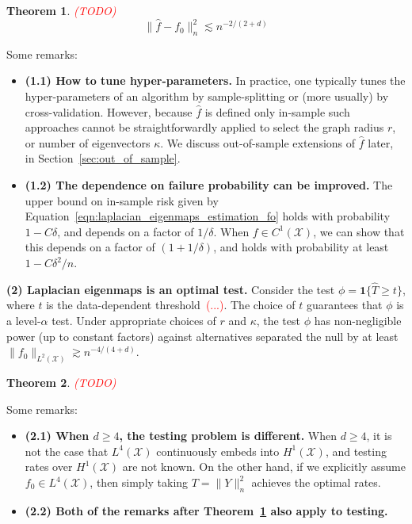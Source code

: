 \documentclass{article}
\newcommand{\1}{\mathbf{1}}
\newcommand{\Leb}{L}
\newcommand{\mc}[1]{\mathcal{#1}}
\newcommand{\wh}[1]{\widehat{#1}}
\theoremstyle{alden}
\theoremstyle{aldenthm}
\newtheorem{theorem}{Theorem}
\theoremstyle{definition}
\theoremstyle{remark}
\begin{document}
\begin{theorem}
	\label{thm:laplacian_eigenmaps_estimation_fo}
	\textcolor{red}{(TODO)}
	\begin{equation}
	\label{eqn:laplacian_eigenmaps_estimation_fo}
	\|\wh{f} - f_0\|_n^2 \lesssim n^{-2/(2 + d)}
	\end{equation}
\end{theorem}
Some remarks:
\begin{itemize}
	\item \textbf{(1.1) How to tune hyper-parameters.} In practice, one typically tunes the hyper-parameters of an algorithm by sample-splitting or (more usually) by cross-validation. However, because $\wh{f}$ is defined only in-sample such approaches cannot be straightforwardly applied to select the graph radius $r$, or number of eigenvectors $\kappa$. We discuss out-of-sample extensions of $\wh{f}$ later, in Section~\ref{sec:out_of_sample}.
	\item \textbf{(1.2) The dependence on failure probability can be improved.} The upper bound on in-sample risk given by Equation~\eqref{eqn:laplacian_eigenmaps_estimation_fo} holds with probability $1 - C\delta$, and depends on a factor of $1/\delta$. When $f \in C^1(\mc{X})$, we can show that this depends on a factor of $(1 + 1/\delta)$, and holds with probability at least $1 - C\delta^2/n$. 
\end{itemize}

\textbf{(2) Laplacian eigenmaps is an optimal test.} Consider the test $\phi = \1\{\wh{T} \geq t\}$, where $t$ is the data-dependent threshold~\textcolor{red}{(...)}. The choice of $t$ guarantees that $\phi$ is a level-$\alpha$ test. Under appropriate choices of $r$ and $\kappa$, the test $\phi$ has non-negligible power (up to constant factors) against alternatives separated the null by at least $\|f_0\|_{\Leb^2(\mc{X})} \gtrsim n^{-4/(4 + d)}$. 

\begin{theorem}
	\label{thm:laplacian_eigenmaps_testing_fo}
	\textcolor{red}{(TODO)}
\end{theorem}
Some remarks:
\begin{itemize}
	\item \textbf{(2.1) When $d \geq 4$, the testing problem is different.} When $d \geq 4$, it is not the case that $\Leb^4(\mc{X})$ continuously embeds into $H^1(\mc{X})$, and testing rates over $H^1(\mc{X})$ are not known. On the other hand, if we explicitly assume $f_0 \in \Leb^4(\mc{X})$, then simply taking $T = \|Y\|_n^2$ achieves the optimal rates.
	\item \textbf{(2.2) Both of the remarks after Theorem~\ref{thm:laplacian_eigenmaps_estimation_fo} also apply to testing.}
\end{itemize}
\end{document}

